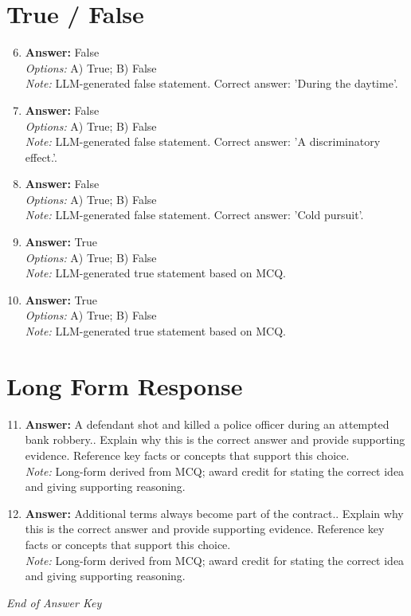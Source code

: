 \documentclass[12pt]{article}
\begin{document}
\section*{True / False}
\begin{enumerate}[label=\arabic*.]
\setcounter{enumi}{5}
\item \textbf{Answer:} False
\\ \textit{Options:} A) True; B) False
\\ \textit{Note:} LLM-generated false statement. Correct answer: 'During the daytime'.
\item \textbf{Answer:} False
\\ \textit{Options:} A) True; B) False
\\ \textit{Note:} LLM-generated false statement. Correct answer: 'A discriminatory effect.'.
\item \textbf{Answer:} False
\\ \textit{Options:} A) True; B) False
\\ \textit{Note:} LLM-generated false statement. Correct answer: 'Cold pursuit'.
\item \textbf{Answer:} True
\\ \textit{Options:} A) True; B) False
\\ \textit{Note:} LLM-generated true statement based on MCQ.
\item \textbf{Answer:} True
\\ \textit{Options:} A) True; B) False
\\ \textit{Note:} LLM-generated true statement based on MCQ.
\end{enumerate}

\section*{Long Form Response}
\begin{enumerate}[label=\arabic*.]
\setcounter{enumi}{10}
\item \textbf{Answer:} A defendant shot and killed a police officer during an attempted bank robbery.. Explain why this is the correct answer and provide supporting evidence. Reference key facts or concepts that support this choice.
\\ \textit{Note:} Long-form derived from MCQ; award credit for stating the correct idea and giving supporting reasoning.
\item \textbf{Answer:} Additional terms always become part of the contract.. Explain why this is the correct answer and provide supporting evidence. Reference key facts or concepts that support this choice.
\\ \textit{Note:} Long-form derived from MCQ; award credit for stating the correct idea and giving supporting reasoning.
\end{enumerate}

\vfill
\noindent\textit{End of Answer Key}
\end{document}
